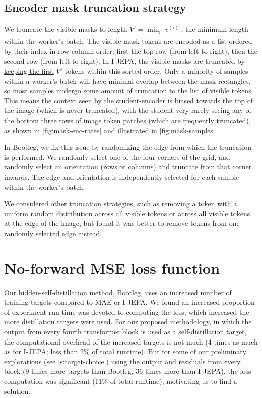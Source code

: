 \subsection{Encoder mask truncation strategy}
We truncate the visible masks to length $V' = \min_i |v^{(i)}|$, the minimum length within the worker's batch.
The visible mask tokens are encoded as a list ordered by their index in row-column order, \ie{} first the top row (from left to right), then the second row (from left to right), \etc{}
In I-JEPA, the visible masks are truncated by \href{https://github.com/facebookresearch/ijepa/blob/52c1ae95d05f743e000e8f10a1f3a79b10cff048/src/masks/multiblock.py#L167}{keeping the first} $V'$ tokens within this sorted order.
Only a minority of samples within a worker's batch will have minimal overlap between the mask rectangles, so most samples undergo some amount of truncation to the list of visible tokens.
This means the context seen by the student-encoder is biased towards the top of the image (which is never truncated), with the student very rarely seeing any of the bottom three rows of image token patches (which are frequently truncated), as shown in \cref{fig:mask-enc-rates} and illustrated in \cref{fig:mask-samples}.

In Bootleg, we fix this issue by randomizing the edge from which the truncation is performed.
We randomly select one of the four corners of the grid, and randomly select an orientation (rows or columns) and truncate from that corner inwards.
The edge and orientation is independently selected for each sample within the worker's batch.

We considered other truncation strategies, such as removing a token with a uniform random distribution across all visible tokens or across all visible tokens at the edge of the image, but found it was better to remove tokens from one randomly selected edge instead.






\FloatBarrier
\section{No-forward MSE loss function}

Our hidden-self-distillation method, Bootleg, uses an increased number of training targets compared to MAE or I-JEPA.
We found an increased proportion of experiment run-time was devoted to computing the loss, which increased the more distillation targets were used.
For our proposed methodology, in which the output from every fourth transformer block is used as a self-distillation target, the computational overhead of the increased targets is not much (4 times as much as for I-JEPA; less than 2\% of total runtime).
But for some of our preliminary explorations (see \cref{s:target-choice}) using the output and residuals from every block (9 times more targets than Bootleg, 36 times more than I-JEPA), the loss computation was significant (11\% of total runtime), motivating us to find a solution.

